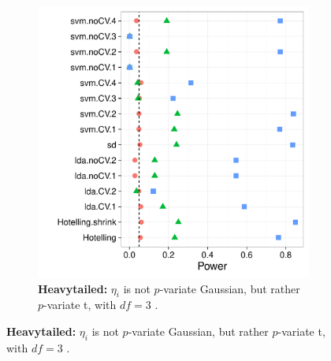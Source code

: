 \documentclass[12pt,a4paper]{article}
\theoremstyle{definition}
\begin{document}
\begin{figure}[h]
\begin{subfigure}{.5\textwidth}
	  \includegraphics[width=1\linewidth]{"art/2016-08-04 19:32:17"}
	  \caption{\textbf{Heavytailed:} $\eta_i$ is not $p$-variate Gaussian, but rather $p$-variate t, with $df=3$ .  } 
	\label{fig:t_null}
	\end{subfigure}
\end{figure}
\end{document}
